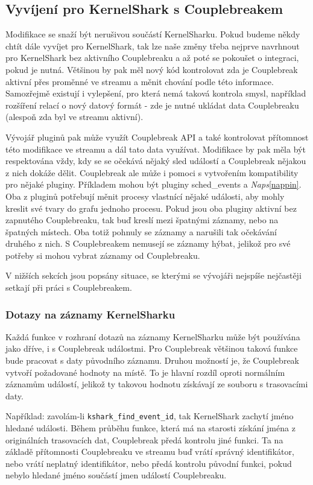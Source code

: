 \subsection{Vyvíjení pro KernelShark s Couplebreakem}
Modifikace se snaží být nerušivou součástí KernelSharku. Pokud budeme někdy chtít dále vyvíjet pro KernelShark, tak lze naše změny třeba nejprve navrhnout pro KernelShark bez aktivního Couplebreaku a až poté se pokoušet o integraci, pokud je nutná. Většinou by pak měl nový kód kontrolovat zda je Couplebreak aktivní přes proměnné ve streamu a měnit chování podle této informace. Samozřejmě existují i vylepšení, pro která nemá taková kontrola smysl, například rozšíření relací o nový datový formát - zde je nutné ukládat data Couplebreaku (alespoň zda byl ve streamu aktivní).

Vývojář pluginů pak může využít Couplebreak API a také kontrolovat přítomnost této modifikace ve streamu a dál tato data využívat. Modifikace by pak měla být respektována vždy, kdy se se očekává nějaký sled událostí a Couplebreak nějakou z nich dokáže dělit. Couplebreak ale může i pomoci s vytvořením kompatibility pro nějaké pluginy. Příkladem mohou být pluginy sched\_events a \emph{Naps}\ref{nappin}. Oba z pluginů potřebují měnit procesy vlastnící nějaké události, aby mohly kreslit své tvary do grafu jednoho procesu. Pokud jsou oba pluginy aktivní bez zapnutého Couplebreaku, tak buď kreslí mezi špatnými záznamy, nebo na špatných místech. Oba totiž pohnuly se záznamy a narušili tak očekávání druhého z nich. S Couplebreakem nemusejí se záznamy hýbat, jelikož pro své potřeby si mohou vybrat záznamy od Couplebreaku.

V nižších sekcích jsou popsány situace, se kterými se vývojáři nejspíše nejčastěji setkají při práci s Couplebreakem.

\subsubsection*{Dotazy na záznamy KernelSharku}
Každá funkce v rozhraní dotazů na záznamy KernelSharku může být používána jako dříve, i s Couplebreak událostmi. Pro Couplebreak většinou taková funkce bude pracovat s daty původního záznamu. Druhou možností je, že Couplebreak vytvoří požadované hodnoty na místě. To je hlavní rozdíl oproti normálním záznamům událostí, jelikož ty takovou hodnotu získávají ze souboru s trasovacími daty.

Například: zavolám-li \texttt{kshark\_find\_event\_id}, tak KernelShark zachytí jméno hledané události. Během průběhu funkce, která má na starosti získání jména z originálních trasovacích dat, Couplebreak předá kontrolu jiné funkci. Ta na základě přítomnosti Couplebreaku ve streamu buď vrátí správný identifikátor, nebo vrátí neplatný identifikátor, nebo předá kontrolu původní funkci, pokud nebylo hledané jméno součástí jmen událostí Couplebreaku.

